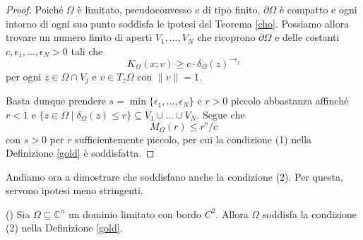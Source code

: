 \begin{proof}
    Poiché $\Omega$ è limitato, pseudoconvesso e di tipo finito, $\partial\Omega$ è compatto e ogni intorno di ogni suo punto soddisfa le ipotesi del Teorema \ref{cho}. Possiamo allora trovare un numero finito di aperti $V_1,\dots, V_N$ che ricoprono $\partial\Omega$ e delle costanti $c,\epsilon_1,\dots,\epsilon_N>0$ tali che
    $$K_\Omega(x;v) \ge c\cdot\delta_\Omega(z)^{-\epsilon_j}$$
    per ogni $z\in\Omega\cap V_j$ e $v\in T_z\Omega$ con $\|v\|=1$.

    Basta dunque prendere $s=\min\{\epsilon_1,\dots,\epsilon_N\}$ e $r>0$ piccolo abbastanza affinché $r<1$ e $\{z\in\Omega\mid\delta_\Omega(z) \le r\}\subseteq V_1\cup\dots\cup V_N$. Segue che
    $$M_\Omega(r) \le r^s/c$$
    con $s>0$ per $r$ sufficientemente piccolo, per cui la condizione (1) nella Definizione \ref{gold} è soddisfatta.
\end{proof}

Andiamo ora a dimostrare che soddisfano anche la condizione (2). Per questa, servono ipotesi meno stringenti.

\begin{prop} \label{finito_is_2}
    (\cite[Theorem 2.3.51]{A1}) Sia $\Omega\subseteq\mathbb{C}^n$ un dominio limitato con bordo $C^2$. Allora $\Omega$ soddisfa la condizione (2) nella Definizione \ref{gold}.
\end{prop}

